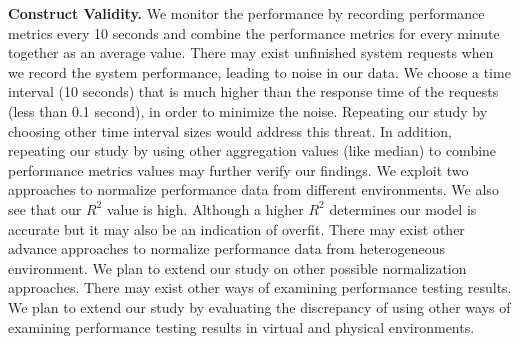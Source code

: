 \noindent \textbf{Construct Validity.}
We monitor the performance by recording performance metrics every 10 seconds and combine the performance metrics for every minute together as an average value. There may exist unfinished system requests when we record the system performance, leading to noise in our data. We choose a time interval (10 seconds) that is much higher than the response time of the requests (less than 0.1 second), in order to minimize the noise. Repeating our study by choosing other time interval sizes would address this threat. In addition, repeating our study by using other aggregation values (like median) to combine performance metrics values may further verify our findings. We exploit two approaches to normalize performance data from different environments. We also see that our {$R^2$} value is high. Although a higher {$R^2$} determines our model is accurate but it may also be an indication of overfit. There may exist other advance approaches to normalize performance data from heterogeneous environment. We plan to extend our study on other possible normalization approaches. There may exist other ways of examining performance testing results. We plan to extend our study by evaluating the discrepancy of using other ways of examining performance testing results in virtual and physical environments.



